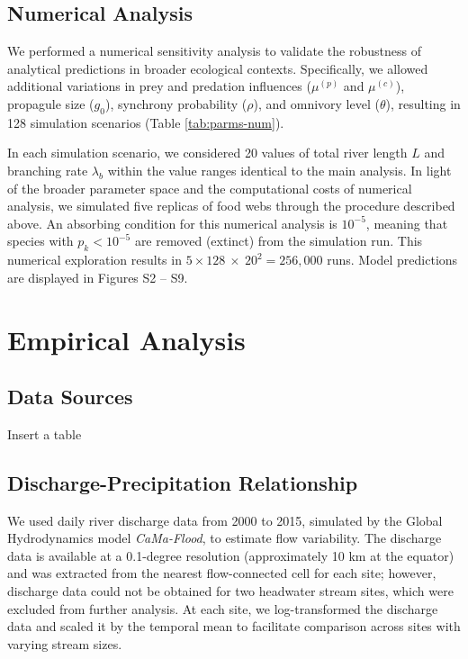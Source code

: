 \documentclass[11pt, class=article, crop=false]{standalone}
\begin{document}
\newpage

\subsection{Numerical Analysis}

We performed a numerical sensitivity analysis to validate the robustness of analytical predictions in broader ecological contexts.
Specifically, we allowed additional variations in prey and predation influences ($\mu^{(p)}$ and $\mu^{(c)}$), propagule size ($g_0$), synchrony probability ($\rho$), and omnivory level ($\theta$), resulting in 128 simulation scenarios (Table \ref{tab:parms-num}).

In each simulation scenario, we considered 20 values of total river length $L$ and branching rate $\lambda_b$ within the value ranges identical to the main analysis.
In light of the broader parameter space and the computational costs of numerical analysis, we simulated five replicas of food webs through the procedure described above.
An absorbing condition for this numerical analysis is $10^{-5}$, meaning that species with $p_k < 10^{-5}$ are removed (extinct) from the simulation run.
This numerical exploration results in $5 \times 128~\times~20^2 = 256,000$ runs.
Model predictions are displayed in Figures S2 -- S9.



\newpage



\section{Empirical Analysis}

\subsection{Data Sources}

Insert a table

\subsection{Discharge-Precipitation Relationship}
We used daily river discharge data from 2000 to 2015, simulated by the Global Hydrodynamics model \textit{CaMa-Flood}, to estimate flow variability.
The discharge data is available at a 0.1-degree resolution (approximately 10 km at the equator) and was extracted from the nearest flow-connected cell for each site; however, discharge data could not be obtained for two headwater stream sites, which were excluded from further analysis.
At each site, we log-transformed the discharge data and scaled it by the temporal mean to facilitate comparison across sites with varying stream sizes.
\end{document}
